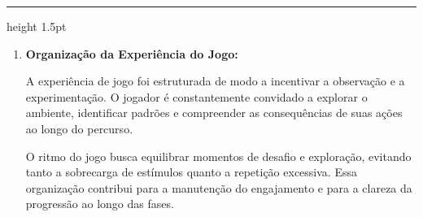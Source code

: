 \documentclass[
oneside,
12pt,                  %
a4paper,               %
brazil,                %
sumario=abnt-6027-2012 %
]{abntex2}
\newenvironment{bloco}{%
	\medskip
	\setlength{\parskip}{1em}
	\setlength{\parindent}{1.25cm}
	\hrule height 1.5pt
	\medskip
}{}
\begin{document}
\begin{bloco}
\begin{enumerate}[font=\bfseries]
			\item \textbf{Organização da Experiência do Jogo:}
			
			A experiência de jogo foi estruturada de modo a incentivar a observação e a experimentação. O jogador é constantemente convidado a explorar o ambiente, identificar padrões e compreender as consequências de suas ações ao longo do percurso.
			
			O ritmo do jogo busca equilibrar momentos de desafio e exploração, evitando tanto a sobrecarga de estímulos quanto a repetição excessiva. Essa organização contribui para a manutenção do engajamento e para a clareza da progressão ao longo das fases.
			
		\end{enumerate}
	\end{bloco}
	
\end{document}
